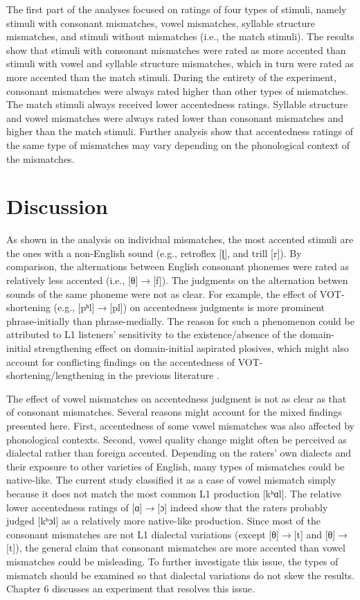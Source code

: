 The first part of the analyses focused on ratings of four types of stimuli, namely stimuli with consonant mismatches, vowel mismatches, syllable structure mismatches, and stimuli without mismatches (i.e., the match stimuli). The results show that stimuli with consonant mismatches were rated as more accented than stimuli with vowel and syllable structure mismatches, which in turn were rated as more accented than the match stimuli. During the entirety of the experiment, consonant mismatches were always rated higher than other types of mismatches. The match stimuli always received lower accentedness ratings. Syllable structure and vowel mismatches were always rated lower than consonant mismatches and higher than the match stimuli. Further analysis show that accentedness ratings of the same type of mismatches may vary depending on the phonological context of the mismatches. 

\section{Discussion}

As shown in the analysis on individual mismatches, the most accented stimuli are the ones with a non-English sound (e.g., retroflex [ɭ], and trill [r]). By comparison, the alternations between English consonant phonemes were rated as relatively less accented (i.e., [θ]$\rightarrow$[f]). The judgments on the alternation betwen sounds of the same phoneme were not as clear. For example, the effect of VOT-shortening (e.g., [pʰl]$\rightarrow$[pl]) on accentedness judgments is more prominent phrase-initially than phrase-medially. The reason for such a phenomenon could be attributed to L1 listeners’ sensitivity to the existence/absence of the domain-initial strengthening effect on domain-initial aspirated plosives, which might also account for conflicting findings on the accentedness of VOT-shortening/lengthening in the previous literature \citep{Gonzalez-Bueno_1997, Magen_1998, Riney_1999}. 

The effect of vowel mismatches on accentedness judgment is not as clear as that of consonant mismatches. Several reasons might account for the mixed findings presented here. First, accentedness of some vowel mismatches was also affected by phonological contexts. Second, vowel quality change might often be perceived as dialectal rather than foreign accented. Depending on the raters’ own dialects and their exposure to other varieties of English, many types of mismatches could be native-like. The current study classified it as a case of vowel mismatch simply because it does not match the most common L1 production [kʰɑl]. The relative lower accentedness ratings of [ɑ]$\rightarrow$[ɔ] indeed show that the raters probably judged [kʰɔl] as a relatively more native-like production. Since most of the consonant mismatches are not L1 dialectal variations (except [θ]$\rightarrow$[t] and [θ]$\rightarrow$[t]), the general claim that consonant mismatches are more accented than vowel mismatches could be misleading. To further investigate this issue, the types of mismatch should be examined so that dialectal variations do not skew the results. Chapter 6 discusses an experiment that resolves this issue. 

